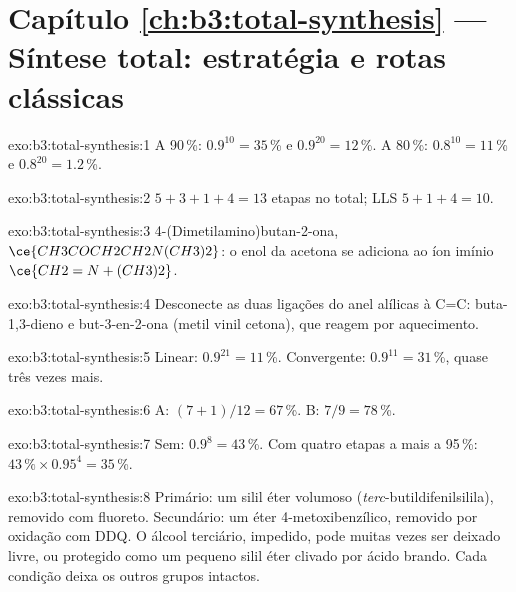 \section*{Capítulo \ref{ch:b3:total-synthesis} --- Síntese total: estratégia e rotas clássicas}

\begin{solution}{exo:b3:total-synthesis:1}
A 90\,\%: $0.9^{10} = 35$\,\% e $0.9^{20} = 12$\,\%. A 80\,\%: $0.8^{10} = 11$\,\% e $0.8^{20} = 1.2$\,\%.
\end{solution}

\begin{solution}{exo:b3:total-synthesis:2}
$5 + 3 + 1 + 4 = 13$ etapas no total; LLS $5 + 1 + 4 = 10$.
\end{solution}

\begin{solution}{exo:b3:total-synthesis:3}
4-(Dimetilamino)butan-2-ona, $\ce{CH3COCH2CH2N(CH3)2}$: o enol da acetona se adiciona ao íon
imínio $\ce{CH2=N+(CH3)2}$.
\end{solution}

\begin{solution}{exo:b3:total-synthesis:4}
Desconecte as duas ligações do anel alílicas à C=C: buta-1,3-dieno e but-3-en-2-ona
(metil vinil cetona), que reagem por aquecimento.
\end{solution}

\begin{solution}{exo:b3:total-synthesis:5}
Linear: $0.9^{21} = 11$\,\%. Convergente: $0.9^{11} = 31$\,\%, quase três vezes mais.
\end{solution}

\begin{solution}{exo:b3:total-synthesis:6}
A: $(7 + 1)/12 = 67$\,\%. B: $7/9 = 78$\,\%.
\end{solution}

\begin{solution}{exo:b3:total-synthesis:7}
Sem: $0.9^8 = 43$\,\%. Com quatro etapas a mais a 95\,\%: $43\,\% \times 0.95^4 = 35$\,\%.
\end{solution}

\begin{solution}{exo:b3:total-synthesis:8}
Primário: um silil éter volumoso (\textit{terc}-butildifenilsilila), removido com fluoreto.
Secundário: um éter 4-metoxibenzílico, removido por oxidação com DDQ. O álcool
terciário, impedido, pode muitas vezes ser deixado livre, ou protegido como um pequeno silil éter
clivado por ácido brando. Cada condição deixa os outros grupos intactos.
\end{solution}

